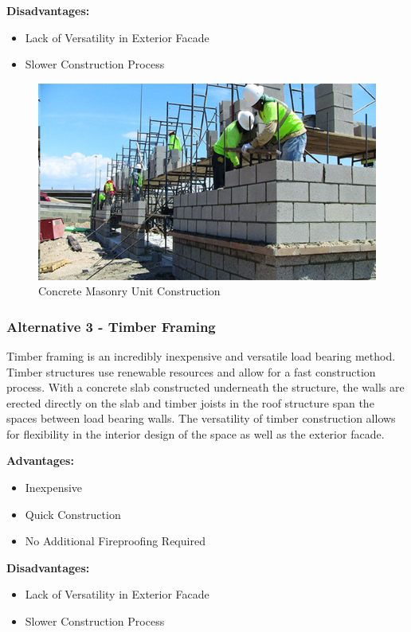 \documentclass{ceri}
\begin{document}
\textbf{Disadvantages:}
\begin{itemize}
\item Lack of Versatility in Exterior Facade
\item Slower Construction Process
\end{itemize}

\begin{figure}[H]
    \centering
    \includegraphics[width=.7\textwidth]{images/Structural2.png}
    \caption{Concrete Masonry Unit Construction}
    \label{fig:S_CMUC}
\end{figure}
\newpage
\subsubsection{Alternative 3 - Timber Framing}
Timber framing is an incredibly inexpensive and versatile load bearing method. Timber structures use renewable resources and allow for a fast construction process. With a concrete slab constructed underneath the structure, the walls are erected directly on the slab and timber joists in the roof structure span the spaces between load bearing walls. The versatility of timber construction allows for flexibility in the interior design of the space as well as the exterior facade.

\textbf{Advantages:}
\begin{itemize}
\item Inexpensive
\item Quick Construction
\item No Additional Fireproofing Required
\end{itemize}

\textbf{Disadvantages:}
\begin{itemize}
\item Lack of Versatility in Exterior Facade
\item Slower Construction Process
\end{itemize}
\end{document}
